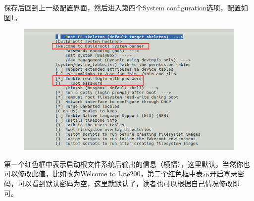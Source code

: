 保存后回到上一级配置界面，然后进入第四个System configuration选项，配置如图\ref{fig:builrsystem}。
\begin{figure}[htbp]
	\centering
	\includegraphics[width=1\linewidth]{chapter2/img/builrsystem}
	\caption{}
	\label{fig:builrsystem}
\end{figure}
第一个红色框中表示启动根文件系统后输出的信息（横幅），这里默认，当然你也可以修改此值，比如改为Welcome to 
Lite200，第二个红色框中表示开启登录密码，可以看到默认密码为空，这里就默认了，读者也可以根据自己情况修改即
可。


